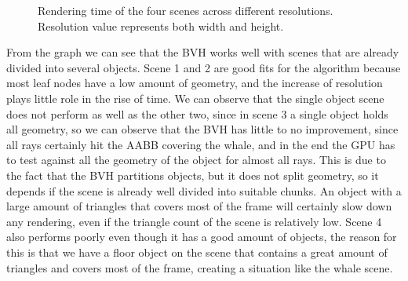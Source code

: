 \documentclass{vgtc}
\begin{document}
\begin{figure}
\centering
{}
\caption{Rendering time of the four scenes across different
  resolutions. Resolution value represents both width and height.}
\label{fig:scenes-results}
\end{figure}

From the graph we can see that the BVH works well with scenes that are
already divided into several objects. Scene 1 and 2 are good fits for
the algorithm because most leaf nodes have a low amount of geometry,
and the increase of resolution plays little role in the rise of
time. We can observe that the single object scene does not perform as
well as the other two, since in scene 3 a single object holds all
geometry, so we can observe that the BVH has little to no improvement,
since all rays certainly hit the AABB covering the whale, and in the
end the GPU has to test against all the geometry of the object for
almost all rays. This is due to the fact that the BVH partitions
objects, but it does not split geometry, so it depends if the scene
is already well divided into suitable chunks. An object with a large
amount of triangles that covers most of the frame will certainly slow
down any rendering, even if the triangle count of the scene is
relatively low. Scene 4 also performs poorly even though it has a good
amount of objects, the reason for this is that we have a floor object
on the scene that contains a great amount of triangles and covers most
of the frame, creating a situation like the whale scene.
\end{document}
